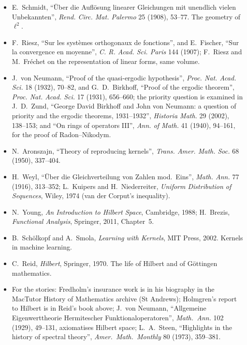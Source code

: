 \begin{itemize}
\item E.~Schmidt, ``\"Uber die Aufl\"osung linearer Gleichungen mit unendlich vielen Unbekannten'', \emph{Rend. Circ. Mat. Palermo} 25 (1908), 53--77. The geometry of $\ell^2$.
\item F.~Riesz, ``Sur les syst\`emes orthogonaux de fonctions'', and E.~Fischer, ``Sur la convergence en moyenne'', \emph{C. R. Acad. Sci. Paris} 144 (1907); F.~Riesz and M.~Fr\'echet on the representation of linear forms, same volume.
\item J.~von Neumann, ``Proof of the quasi-ergodic hypothesis'', \emph{Proc. Nat. Acad. Sci.} 18 (1932), 70--82, and G.~D.~Birkhoff, ``Proof of the ergodic theorem'', \emph{Proc. Nat. Acad. Sci.} 17 (1931), 656--660; the priority question is examined in J.~D.~Zund, ``George David Birkhoff and John von Neumann: a question of priority and the ergodic theorems, 1931--1932'', \emph{Historia Math.} 29 (2002), 138--153; and ``On rings of operators III'', \emph{Ann. of Math.} 41 (1940), 94--161, for the proof of Radon--Nikodym.
\item N.~Aronszajn, ``Theory of reproducing kernels'', \emph{Trans. Amer. Math. Soc.} 68 (1950), 337--404.
\item H.~Weyl, ``\"Uber die Gleichverteilung von Zahlen mod.~Eins'', \emph{Math. Ann.} 77 (1916), 313--352; L.~Kuipers and H.~Niederreiter, \emph{Uniform Distribution of Sequences}, Wiley, 1974 (van der Corput's inequality).
\item N.~Young, \emph{An Introduction to Hilbert Space}, Cambridge, 1988; H.~Brezis, \emph{Functional Analysis}, Springer, 2011, Chapter~5.
\item B.~Sch\"olkopf and A.~Smola, \emph{Learning with Kernels}, MIT Press, 2002. Kernels in machine learning.
\item C.~Reid, \emph{Hilbert}, Springer, 1970. The life of Hilbert and of G\"ottingen mathematics.
\item For the stories: Fredholm's insurance work is in his biography in the MacTutor History of Mathematics archive (St Andrews); Holmgren's report
to Hilbert is in Reid's book above; J.~von Neumann, ``Allgemeine Eigenwerttheorie Hermitescher Funktionaloperatoren'', \emph{Math.\ Ann.} 102 (1929), 49--131, axiomatises Hilbert space;
L.~A.~Steen, ``Highlights in the history of spectral theory'', \emph{Amer.\ Math.\ Monthly} 80 (1973), 359--381.
\end{itemize}
